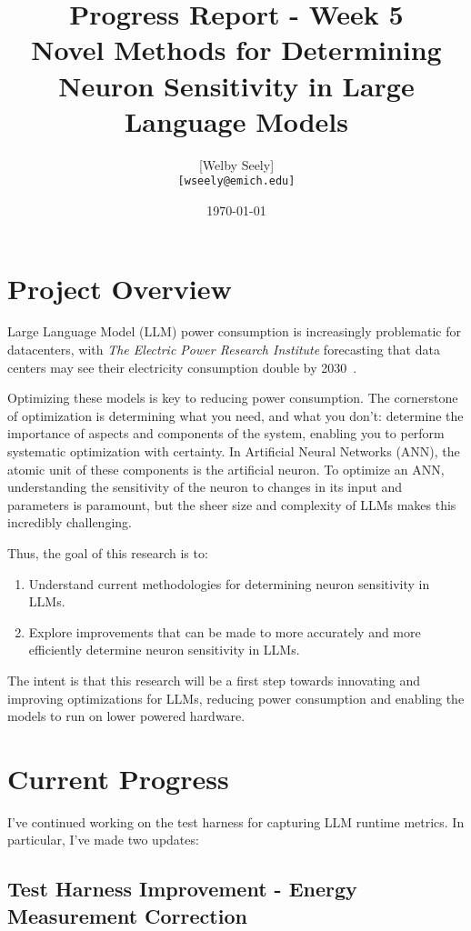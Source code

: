 \documentclass{article}
\title{Progress Report - Week 5 \\
\large Novel Methods for Determining Neuron Sensitivity in Large Language Models}
\author{
    [Welby Seely] \\
    \texttt{[wseely@emich.edu]}
}
\date{\today}
\begin{document}
    \maketitle


    \section{Project Overview}\label{sec:project-overview}
    Large Language Model (LLM) power consumption is increasingly problematic for datacenters, with \textit{The Electric Power
    Research Institute} forecasting that data centers may see their electricity consumption double by
    2030~\cite{kindig2024}.

    Optimizing these models is key to reducing power consumption.
    The cornerstone of optimization is determining what you need, and what you don't: determine the importance of
    aspects and components of the system, enabling you to perform systematic optimization with certainty.
    In Artificial Neural Networks (ANN), the atomic unit of these components is the artificial neuron.
    To optimize an ANN, understanding the sensitivity of the neuron to changes in its input and parameters is paramount,
    but the sheer size and complexity of LLMs makes this incredibly challenging.

    Thus, the goal of this research is to:
    \begin{enumerate}
        \item Understand current methodologies for determining neuron sensitivity in LLMs.
        \item Explore improvements that can be made to more accurately and more efficiently determine neuron sensitivity in
        LLMs.
    \end{enumerate}

    The intent is that this research will be a first step towards innovating and improving optimizations for LLMs,
    reducing power consumption and enabling the models to run on lower powered hardware.


    \section{Current Progress}\label{sec:current-progress}
    I've continued working on the test harness for capturing LLM runtime metrics.
    In particular, I've made two updates:

    \subsection{Test Harness Improvement - Energy Measurement Correction}\label{subsec:test-harness-correction}
\end{document}
